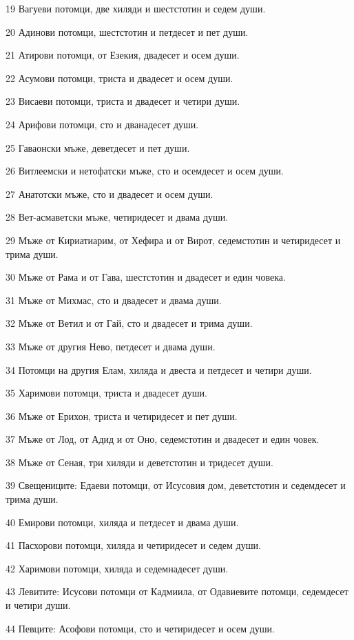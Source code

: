 \par 19 Вагуеви потомци, две хиляди и шестстотин и седем души.
\par 20 Адинови потомци, шестстотин и петдесет и пет души.
\par 21 Атирови потомци, от Езекия, двадесет и осем души.
\par 22 Асумови потомци, триста и двадесет и осем души.
\par 23 Висаеви потомци, триста и двадесет и четири души.
\par 24 Арифови потомци, сто и дванадесет души.
\par 25 Гаваонски мъже, деветдесет и пет души.
\par 26 Витлеемски и нетофатски мъже, сто и осемдесет и осем души.
\par 27 Анатотски мъже, сто и двадесет и осем души.
\par 28 Вет-асмаветски мъже, четиридесет и двама души.
\par 29 Мъже от Кириатиарим, от Хефира и от Вирот, седемстотин и четиридесет и трима души.
\par 30 Мъже от Рама и от Гава, шестстотин и двадесет и един човека.
\par 31 Мъже от Михмас, сто и двадесет и двама души.
\par 32 Мъже от Ветил и от Гай, сто и двадесет и трима души.
\par 33 Мъже от другия Нево, петдесет и двама души.
\par 34 Потомци на другия Елам, хиляда и двеста и петдесет и четири души.
\par 35 Харимови потомци, триста и двадесет души.
\par 36 Мъже от Ерихон, триста и четиридесет и пет души.
\par 37 Мъже от Лод, от Адид и от Оно, седемстотин и двадесет и един човек.
\par 38 Мъже от Сеная, три хиляди и деветстотин и тридесет души.
\par 39 Свещениците: Едаеви потомци, от Исусовия дом, деветстотин и седемдесет и трима души.
\par 40 Емирови потомци, хиляда и петдесет и двама души.
\par 41 Пасхорови потомци, хиляда и четиридесет и седем души.
\par 42 Харимови потомци, хиляда и седемнадесет души.
\par 43 Левитите: Исусови потомци от Кадмиила, от Одавиевите потомци, седемдесет и четири души.
\par 44 Певците: Асофови потомци, сто и четиридесет и осем души.
